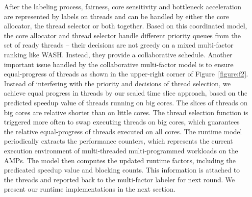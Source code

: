 

After the labeling process, fairness, core sensitivity and bottleneck acceleration are represented by labels on threads and can be handled by either the core allocator, the thread selector or both together. Based on this coordinated model, the core allocator and thread selector handle different priority queues from the set of ready threads -- their decisions are not greedy on a mixed multi-factor ranking like WASH. Instead, they provide a collaborative schedule.
Another important issue handled by the collaborative multi-factor model is to ensure equal-progress of threads as shown in the upper-right corner of Figure~\ref{figure:f2}. Instead of interfering with the priority and decisions of thread selection, we achieve equal progress in threads by our scaled time slice approach, based on the predicted speedup value of threads running on big cores. The slices of threads on big cores are relative shorter than on little cores. The thread selection function is triggered more often to swap executing threads on big cores, which guarantees the relative equal-progress of threads executed on all cores.
The runtime model periodically extracts the performance counters, which represents the current execution environment of multi-threaded multi-programmed workloads on the AMPs. The model then computes the updated runtime factors, including the predicated speedup value and blocking counts. This information is attached to the threads and reported back to the multi-factor labeler for next round. We present our runtime implementations in the next section. 




